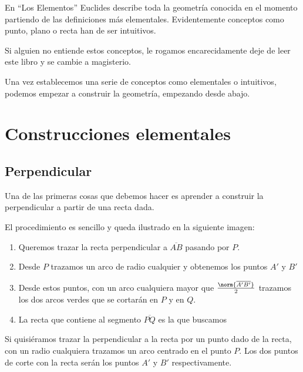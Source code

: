 \documentclass{apuntes}
\begin{document}
En ``Los Elementos'' Euclides describe toda la geometría conocida en el momento partiendo de las definiciones más elementales. Evidentemente conceptos como punto, plano o recta han de ser intuitivos.

Si alguien no entiende estos conceptos, le rogamos encarecidamente deje de leer este libro y se cambie a magisterio.

Una vez establecemos una serie de conceptos como elementales o intuitivos, podemos empezar a construir la geometría, empezando desde abajo.

\section{Construcciones elementales}
\subsection{Perpendicular}
Una de las primeras cosas que debemos hacer es aprender a construir la perpendicular a partir de una recta dada. 

El procedimiento es sencillo y queda ilustrado en la siguiente imagen:

\begin{minipage}{0.4\textwidth}
\begin{center}
\end{center}
\end{minipage}
\begin{minipage}{0.57\textwidth}
\begin{enumerate}
\item Queremos trazar la recta perpendicular a $\overline{AB}$ pasando por $P$.
\item Desde $P$ trazamos un arco de radio cualquier y obtenemos los puntos $A'$ y $B'$
\item Desde estos puntos, con un arco cualquiera mayor que $\frac{\norm{\overline{A'B'}}}{2}$ trazamos los dos arcos verdes que se cortarán en $P$ y en $Q$.
\item La recta que contiene al segmento $\overline{PQ}$ es la que buscamos
\end{enumerate}
\end{minipage}

Si quisiéramos trazar la perpendicular a la recta por un punto dado de la recta, con un radio cualquiera trazamos un arco centrado en el punto $P$. Los dos puntos de corte con la recta serán los puntos $A'$ y $B'$ respectivamente.
\end{document}
